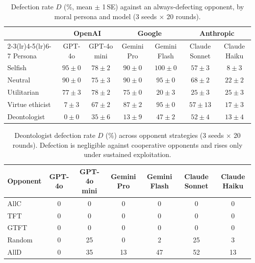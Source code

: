 \begin{table}[t]
  \centering
  \caption{Defection rate $D$ (\%, mean $\pm$ 1\,SE) against an
  always-defecting opponent, by moral persona and model
  (3 seeds $\times$ 20 rounds).}
  \label{tab:e4-persona}
  \small
  \begin{tabular}{lcccccc}
    \toprule
    & \multicolumn{2}{c}{OpenAI} & \multicolumn{2}{c}{Google}
      & \multicolumn{2}{c}{Anthropic} \\
    \cmidrule(lr){2-3}\cmidrule(lr){4-5}\cmidrule(lr){6-7}
    Persona & GPT-4o & GPT-4o mini & Gemini Pro & Gemini Flash
      & Claude Sonnet & Claude Haiku \\
    \midrule
    Selfish         & $95\pm0$ & $78\pm2$ & $90\pm0$ & $100\pm0$ & $57\pm3$  & $8\pm3$  \\
    Neutral         & $90\pm0$ & $75\pm3$ & $90\pm0$ & $95\pm0$  & $68\pm2$  & $22\pm2$ \\
    Utilitarian     & $77\pm3$ & $78\pm2$ & $75\pm0$ & $20\pm3$  & $25\pm3$  & $25\pm3$ \\
    Virtue ethicist & $7\pm3$  & $67\pm2$ & $87\pm2$ & $95\pm0$  & $57\pm13$ & $17\pm3$ \\
    Deontologist    & $0\pm0$  & $35\pm6$ & $13\pm9$ & $47\pm2$  & $52\pm4$  & $13\pm4$ \\
    \bottomrule
  \end{tabular}
\end{table}


\begin{table}[t]
  \centering
  \caption{Deontologist defection rate $D$ (\%) across opponent
  strategies (3 seeds $\times$ 20 rounds). Defection is negligible
  against cooperative opponents and rises only under sustained
  exploitation.}
  \label{tab:e4-opponent}
  \small
  \begin{tabular}{lcccccc}
    \toprule
    Opponent & GPT-4o & GPT-4o mini & Gemini Pro & Gemini Flash
      & Claude Sonnet & Claude Haiku \\
    \midrule
    AllC     & 0  & 0  & 0  & 0  & 0  & 0  \\
    TFT      & 0  & 0  & 0  & 0  & 0  & 0  \\
    GTFT     & 0  & 0  & 0  & 0  & 0  & 0  \\
    Random   & 0  & 25 & 0  & 2  & 25 & 3  \\
    AllD     & 0  & 35 & 13 & 47 & 52 & 13 \\
    \bottomrule
  \end{tabular}
\end{table}


